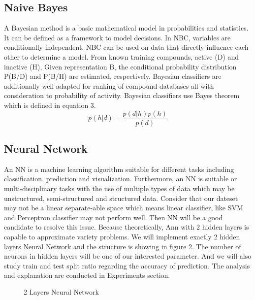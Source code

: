 \documentclass{article} %
\begin{document}
\subsection{Naive Bayes}
A Bayesian method is a basic mathematical model in probabilities and statistics. It can be defined as a framework to model decisions. In NBC, variables are conditionally independent. NBC can be used on data that directly influence each other to determine a model. From known training compounds, active (D) and inactive (H), Given representation B, the conditional probability distribution P(B/D) and P(B/H) are estimated, respectively. Bayesian classifiers are additionally well adapted for ranking of compound databases all with consideration to probability of activity.
Bayesian classifiers use Bayes theorem which is defined in equation 3.
\begin{equation}
p(h|d) = \frac{p(d|h)p(h)}{p(d)}
\end{equation}


\subsection{Neural Network}
An NN is a machine learning algorithm suitable for different tasks including classification, prediction and visualization. Furthermore, an NN is suitable or multi-disciplinary tasks with the use of multiple types of data which may be unstructured, semi-structured and structured data. Consider that our dateset may not be a linear separate-able space which means linear classifier, like SVM and Perceptron classifier may not perform well. Then NN will be a good candidate to resolve this issue. Because theoretically, Ann with 2 hidden layers is capable to approximate variety problems. We will implement exactly 2 hidden layers Neural Network and the structure is showing in figure 2. The number of neurons in hidden layers will be one of our interested parameter. And we will also study train and test split ratio regarding the accuracy of prediction. The analysis and explanation are conducted in Experiments section.

\begin{figure}[H]
\begin{center}
\caption{2 Layers Neural Network}
\end{center}
\end{figure}
\end{document}
